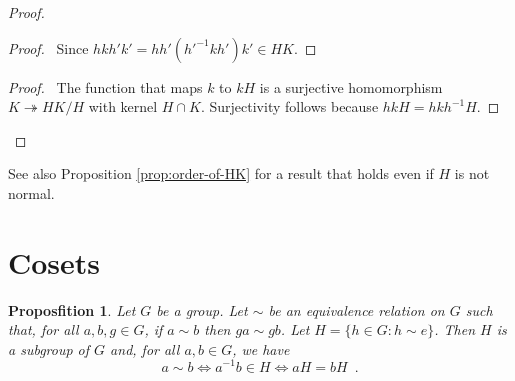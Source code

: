\documentclass{book}
\let\qed\relax
\newtheorem{prop}{Proposfition}[chapter]
\theoremstyle{definition}
\newcommand{\inv}[1]{\ensuremath{{#1}^{-1}}}
\begin{document}
\begin{proof}
\pf
{}
\begin{proof}
	\pf\ Since $hkh'k' = hh'(\inv{h'}kh')k' \in HK$.
\end{proof}
\begin{proof}
\pf\ The function that maps $k$ to $kH$ is a surjective homomorphism $K \twoheadrightarrow HK/H$ with kernel $H \cap K$. Surjectivity follows because $hkH = hk\inv{h}H$.
\end{proof}
\qed
\end{proof}

See also Proposition \ref{prop:order-of-HK} for a result that holds even if $H$ is not normal.

\section{Cosets}

\begin{prop}
\label{prop:sim-gives-H}
Let $G$ be a group. Let $\sim$ be an equivalence relation on $G$ such that, for all $a,b,g \in G$, if $a \sim b$ then $ga \sim gb$. Let $H = \{ h \in G : h \sim e \}$. Then $H$ is a subgroup of $G$ and, for all $a,b \in G$, we have
\[ a \sim b \Leftrightarrow \inv{a} b \in H \Leftrightarrow aH = bH \enspace . \]
\end{prop}
\end{document}
